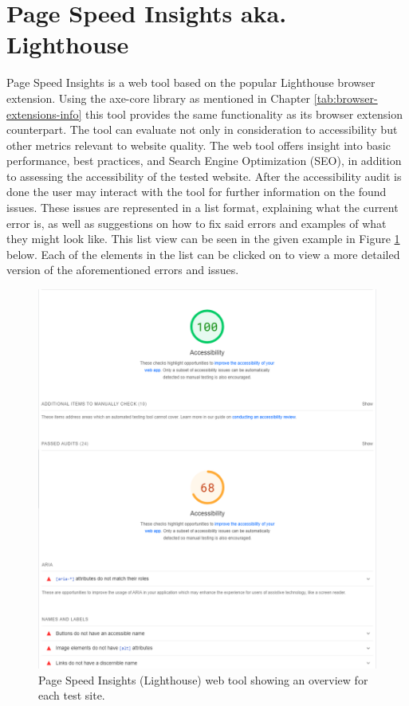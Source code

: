 \section{Page Speed Insights aka. Lighthouse}

Page Speed Insights \parencite{PSIL} is a web tool based on the popular Lighthouse browser extension. Using the axe-core library as mentioned in Chapter \ref{tab:browser-extensions-info} this tool provides the same functionality as its browser extension counterpart. The tool can evaluate not only in consideration to accessibility but other metrics relevant to website quality. The web tool offers insight into basic performance, best practices, and Search Engine Optimization (SEO), in addition to assessing the accessibility of the tested website. After the accessibility audit is done the user may interact with the tool for further information on the found issues. These issues are represented in a list format, explaining what the current error is, as well as suggestions on how to fix said errors and examples of what they might look like. This list view can be seen in the given example in Figure \ref{fig:PSIL} below. Each of the elements in the list can be clicked on to view a more detailed version of the aforementioned errors and issues. 

\begin{figure}[tp]
\centering
\includegraphics[keepaspectratio,width=\linewidth,height=\halfh]
{images/lighthouse.png}

\caption[Page Speed Insights Overview]
{%
Page Speed Insights (Lighthouse) web tool showing an overview for each test site.
}
\label{fig:PSIL}
\end{figure}




